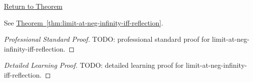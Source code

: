 \newpage
{}
\label{prf:limit-at-neg-infinity-iff-reflection}

\begin{remark*}[Return]
\hyperref[thm:limit-at-neg-infinity-iff-reflection]{Return to Theorem}
\end{remark*}

\begin{theorem*}
See \hyperref[thm:limit-at-neg-infinity-iff-reflection]{Theorem~\ref*{thm:limit-at-neg-infinity-iff-reflection}}.
\end{theorem*}

\begin{proof}[Professional Standard Proof]
\LRAProofBodyStart
TODO: professional standard proof for limit-at-neg-infinity-iff-reflection.
\end{proof}

\begin{proof}[Detailed Learning Proof]
\LRAProofBodyStart
TODO: detailed learning proof for limit-at-neg-infinity-iff-reflection.
\end{proof}

\begin{remark*}
\end{remark*}

\begin{dependencies}
\NoLocalDependencies
\end{dependencies}

\clearpage
